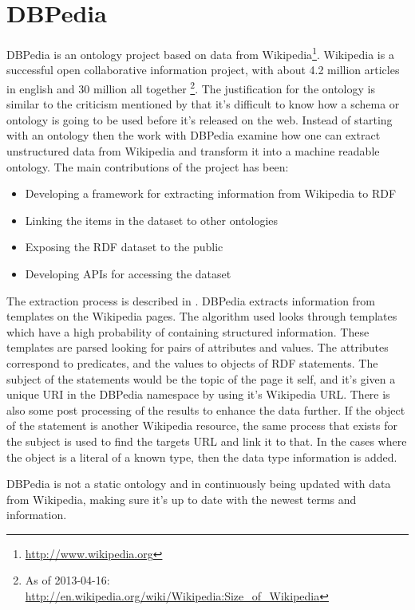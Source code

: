 \section{DBPedia}
DBPedia is an ontology project based on data from Wikipedia\footnote{\url{http://www.wikipedia.org}}.
Wikipedia is a successful open collaborative information project,
with about 4.2 million articles in english and 30 million all together
\footnote{As of 2013-04-16: \url{http://en.wikipedia.org/wiki/Wikipedia:Size_of_Wikipedia}}.
The justification for the ontology is similar to the criticism mentioned by \citet{Shirky2007}
that it's difficult to know how a schema or ontology is going to be used before it's released on the web.
Instead of starting with an ontology then the work with DBPedia examine how one can extract unstructured data
from Wikipedia and transform it into a machine readable ontology.
The main contributions of the project has been\citep{Auer2007}:

\begin{itemize}
	\item Developing a framework for extracting information from Wikipedia to RDF
	\item Linking the items in the dataset to other ontologies
	\item Exposing the RDF dataset to the public
	\item Developing APIs for accessing the dataset
\end{itemize}

The extraction process is described in \citet{Auer2007a}.
DBPedia extracts information from templates on the Wikipedia pages.
The algorithm used looks through templates which have a high probability of containing structured information.
These templates are parsed looking for pairs of attributes and values.
The attributes correspond to predicates, and the values to objects of RDF statements.
The subject of the statements would be the topic of the page it self,
and it's given a unique URI in the DBPedia namespace by using it's Wikipedia URL.
There is also some post processing of the results to enhance the data further.
If the object of the statement is another Wikipedia resource,
the same process that exists for the subject is used to find the targets URL and link it to that.
In the cases where the object is a literal of a known type, then the data type information is added.

DBPedia is not a static ontology and in continuously being updated with data from Wikipedia,
making sure it's up to date with the newest terms and information.
